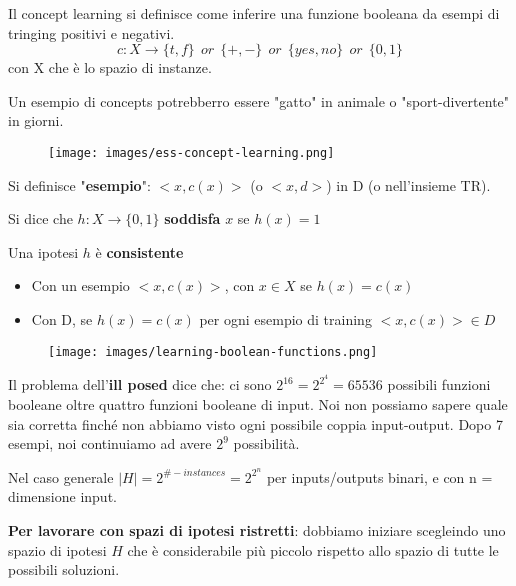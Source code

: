 \begin{definition}
    Il concept learning si definisce come inferire una funzione booleana da esempi di tringing
    positivi e negativi.
    $$c: X \to \{t,f\} \:\:or\:\: \{+, -\} \:\:or\:\: \{yes, no\} \:\:or\:\: \{0,1\}$$
    con X che è lo spazio di instanze.
\end{definition}
\hspace{-15pt}Un esempio di concepts potrebberro essere "gatto" in animale o "sport-divertente" in giorni.
\begin{figure}[h!]
    \centering
    \texttt{[image: images/ess-concept-learning.png]}
\end{figure}
\begin{definition}
    Si definisce "\textbf{esempio}": $<x, c(x)>$ (o $<x,d>$) in D (o nell'insieme TR).
\end{definition}
\begin{definition}
    Si dice che $h: X\to \{0,1\}$ \textbf{soddisfa} $x$ se $h(x) = 1$
\end{definition}
\begin{definition}
    Una ipotesi $h$ è \textbf{consistente}
    \begin{itemize}
        \item Con un esempio $<x, c(x)>$, con $x \in X$ se $h(x) = c(x)$
        \item Con D, se $h(x) = c(x)$ per ogni esempio di training $<x, c(x)> \in D$
    \end{itemize}
\end{definition}
\begin{figure}[h!]
    \centering
    \texttt{[image: images/learning-boolean-functions.png]}
\end{figure}
\hspace{-15pt}Il problema dell'\textbf{ill posed} dice che: ci sono $2^{16} = 2^{2^4} = 65536$ possibili funzioni booleane
oltre quattro funzioni booleane di input. Noi non possiamo sapere quale sia corretta finché non abbiamo visto ogni possibile coppia
input-output. Dopo 7 esempi, noi continuiamo ad avere $2^9$ possibilità.
\begin{definition}
    Nel caso generale $|H| = 2^{\#-instances} = 2^{2^n}$ per inputs/outputs binari, e con n = dimensione input.
\end{definition}
\hspace{-15pt}\textbf{Per lavorare con spazi di ipotesi ristretti}: dobbiamo iniziare scegleindo uno spazio 
di ipotesi $H$ che è considerabile più piccolo rispetto allo spazio di tutte le possibili soluzioni.


